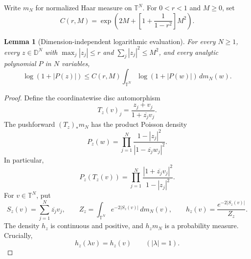 \documentclass[11pt,a4paper]{article}
\newtheorem{lemma}[theorem]{Lemma}
\theoremstyle{remark}
\begin{document}
Write $m_N$ for normalized Haar measure on $\mathbb T^N$.
For $0<r<1$ and $M\ge0$, set
\begin{equation}
 C(r,M)=\exp\left(
 2M+\left[1+\frac1{1-r^2}\right]M^2
 \right).
 \label{eq:690-1}
\end{equation}

\begin{lemma}[Dimension-independent logarithmic evaluation]
For every $N\ge1$, every $z\in\mathbb D^N$ with
$\max_j|z_j|\le r$ and $\sum_j|z_j|^2\le M^2$, and every analytic
polynomial $P$ in $N$ variables,
\begin{equation}
 \log(1+|P(z)|)
 \le C(r,M)\int_{\mathbb T^N}\log(1+|P(w)|)\,dm_N(w).
 \label{eq:690-2}
\end{equation}
\end{lemma}

\begin{proof}
Define the coordinatewise disc automorphism
\[
 T_z(v)_j=\frac{z_j+v_j}{1+\overline{z_j}v_j}.
\]
The pushforward $(T_z)_*m_N$ has the product Poisson density
\[
 P_z(w)=\prod_{j=1}^N
 \frac{1-|z_j|^2}{|1-\overline{z_j}w_j|^2}.
\]
In particular,
\begin{equation}
 P_z(T_z(v))
 =\prod_{j=1}^N
 \frac{|1+\overline{z_j}v_j|^2}{1-|z_j|^2}.
 \label{eq:690-3}
\end{equation}
For $v\in\mathbb T^N$, put
\begin{equation}
 S_z(v)=\sum_{j=1}^N\overline{z_j}v_j,\qquad
 Z_z=\int_{\mathbb T^N}e^{-2|S_z(v)|}\,dm_N(v),\qquad
 h_z(v)=\frac{e^{-2|S_z(v)|}}{Z_z}.
 \label{eq:690-4}
\end{equation}
The density $h_z$ is continuous and positive, and $h_zm_N$ is a
probability measure.  Crucially,
\begin{equation}
 h_z(\lambda v)=h_z(v)\qquad(|\lambda|=1).
 \label{eq:690-5}
\end{equation}


\end{proof}
\end{document}
